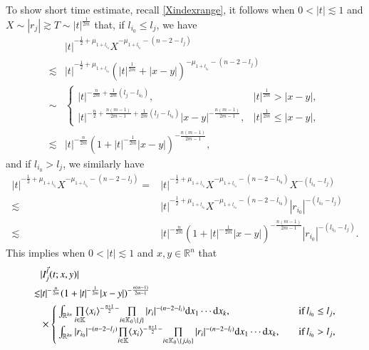 \documentclass[11pt,reqno]{amsart}
\def\d{{\rm d}}
\numberwithin{equation}{section}
\theoremstyle{definition}
\begin{document}
To show short time estimate, recall \eqref{Xindexrange}, it follows when $0<|t|\lesssim1$ and $X\sim|r_j|\gtrsim T\sim|t|^\frac{1}{2m}$ that, if $l_{i_0}\leq l_j$, we have
\begin{equation}\label{cal2}
	\begin{split}
		&|t|^{-\frac12+\mu_{1+l_{i_0}}}X^{-\mu_{1+l_{i_0}}-(n-2-l_j)}\\
		\lesssim&|t|^{-\frac12+\mu_{1+l_{i_0}}}(|t|^{\frac{1}{2m}}+|x-y|)^{-\mu_{1+l_{i_0}}-(n-2-l_j)}\\
		\sim&\begin{cases}
			|t|^{-\frac{n}{2m}+\frac{1}{2m}(l_j-l_{i_0})},\quad&|t|^\frac{1}{2m}>|x-y|,\\
			|t|^{-\frac n2+\frac{n(m-1)}{2m-1}+\frac{1}{2m}(l_j-l_{i_0})}|x-y|^{-\frac{n(m-1)}{2m-1}},&|t|^\frac{1}{2m}\leq|x-y|,
		\end{cases}\\
		\lesssim&|t|^{-\frac{n}{2m}}(1+|t|^{-\frac{1}{2m}}|x-y|)^{-\frac{n(m-1)}{2m-1}},
	\end{split}
\end{equation}
and if $l_{i_0}>l_j$, we similarly have
\begin{equation*}
	\begin{split}
		|t|^{-\frac12+\mu_{1+l_{i_0}}}X^{-\mu_{1+l_{i_0}}-(n-2-l_j)}=&|t|^{-\frac12+\mu_{1+l_{i_0}}}X^{-\mu_{1+l_{i_0}}-(n-2-l_{i_0})}X^{-(l_{i_0}-l_j)}\\
		\lesssim&|t|^{-\frac12+\mu_{1+l_{i_0}}}X^{-\mu_{1+l_{i_0}}-(n-2-l_{i_0})}|r_{i_0}|^{-(l_{i_0}-l_j)}\\
		\lesssim&|t|^{-\frac{n}{2m}}(1+|t|^{-\frac{1}{2m}}|x-y|)^{-\frac{n(m-1)}{2m-1}}|r_{i_0}|^{-(l_{i_0}-l_j)}.
	\end{split}
\end{equation*}
This implies when $0<|t|\lesssim1$ and $x,y\in\mathbb{R}^n$ that
\begin{equation*}
	\begin{split}
		&|I_j^{\vec{l}}(t;x,y)|\\
		\lesssim&|t|^{-\frac{n}{2m}}(1+|t|^{-\frac{1}{2m}}|x-y|)^{-\frac{n(m-1)}{2m-1}}\\
		&\times\begin{cases}
			\int_{\mathbb{R}^{kn}}\mbox{$\prod\limits_{i\in\mathbb{K}}\langle x_i\rangle^{-\frac{n+1}{2}-}$}\mbox{$\prod\limits_{i\in\mathbb{K}_0\setminus\{j\}}|r_i|^{-(n-2-l_i)}$}\d x_1\cdots \d x_k,\quad&\text{if\,}l_{i_0}\leq l_j,\\
			\int_{\mathbb{R}^{kn}}|r_{i_0}|^{-(n-2-l_j)}\mbox{$\prod\limits_{i\in\mathbb{K}}\langle x_i\rangle^{-\frac{n+1}{2}-}$}\mbox{$\prod\limits_{i\in\mathbb{K}_0\setminus\{j,i_0\}}|r_i|^{-(n-2-l_i)}$}\d x_1\cdots \d x_k,\quad&\text{if\,}l_{i_0}>l_j,
		\end{cases}
	\end{split}
\end{equation*}
\end{document}
